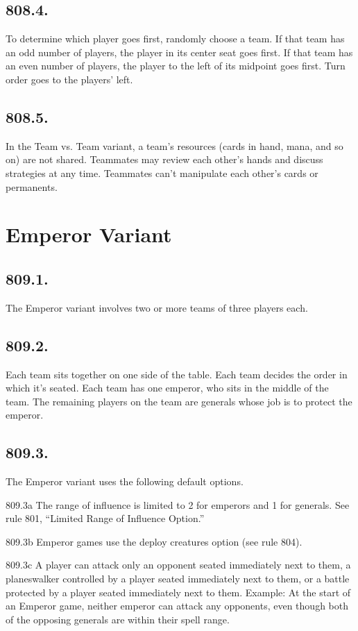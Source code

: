 \subsection*{808.4.}
To determine which player goes first, randomly choose a team. If that team has an odd number of players, the player in its center seat goes first. If that team has an even number of players, the player to the left of its midpoint goes first. Turn order goes to the players’ left.

\subsection*{808.5.}
In the Team vs. Team variant, a team’s resources (cards in hand, mana, and so on) are not shared. Teammates may review each other’s hands and discuss strategies at any time. Teammates can’t manipulate each other’s cards or permanents.

\section{Emperor Variant}
\subsection*{809.1.}
The Emperor variant involves two or more teams of three players each.

\subsection*{809.2.}
Each team sits together on one side of the table. Each team decides the order in which it’s seated. Each team has one emperor, who sits in the middle of the team. The remaining players on the team are generals whose job is to protect the emperor.

\subsection*{809.3.}
The Emperor variant uses the following default options.

809.3a The range of influence is limited to 2 for emperors and 1 for generals. See rule 801, “Limited Range of Influence Option.”

809.3b Emperor games use the deploy creatures option (see rule 804).

809.3c A player can attack only an opponent seated immediately next to them, a planeswalker controlled by a player seated immediately next to them, or a battle protected by a player seated immediately next to them.
Example: At the start of an Emperor game, neither emperor can attack any opponents, even though both of the opposing generals are within their spell range.

